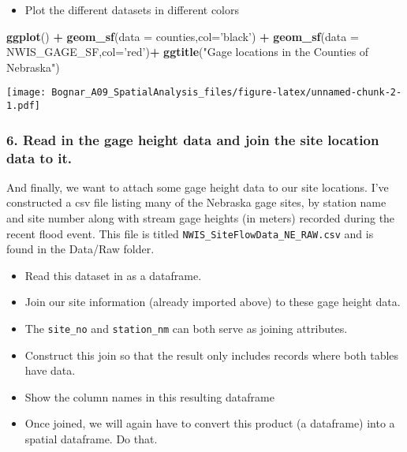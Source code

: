 \documentclass[]{article}
\newenvironment{Shaded}{\begin{snugshade}}{\end{snugshade}}
\newcommand{\KeywordTok}[1]{\textcolor[rgb]{0.13,0.29,0.53}{\textbf{#1}}}
\newcommand{\DataTypeTok}[1]{\textcolor[rgb]{0.13,0.29,0.53}{#1}}
\newcommand{\StringTok}[1]{\textcolor[rgb]{0.31,0.60,0.02}{#1}}
\newcommand{\OperatorTok}[1]{\textcolor[rgb]{0.81,0.36,0.00}{\textbf{#1}}}
\newcommand{\NormalTok}[1]{#1}
\providecommand{\tightlist}{%
  \setlength{\itemsep}{0pt}\setlength{\parskip}{0pt}}
\begin{document}
\begin{itemize}
\tightlist
\item
  Plot the different datasets in different colors
\end{itemize}

\begin{Shaded}
\begin{Highlighting}[]
\KeywordTok{ggplot}\NormalTok{() }\OperatorTok{+}\StringTok{ }
\StringTok{  }\KeywordTok{geom_sf}\NormalTok{(}\DataTypeTok{data =}\NormalTok{ counties,}\DataTypeTok{col=}\StringTok{'black'}\NormalTok{) }\OperatorTok{+}\StringTok{ }
\StringTok{  }\KeywordTok{geom_sf}\NormalTok{(}\DataTypeTok{data =}\NormalTok{ NWIS_GAGE_SF,}\DataTypeTok{col=}\StringTok{'red'}\NormalTok{)}\OperatorTok{+}
\StringTok{  }\KeywordTok{ggtitle}\NormalTok{(}\StringTok{"Gage locations in the Counties of Nebraska"}\NormalTok{)}
\end{Highlighting}
\end{Shaded}

\texttt{[image: Bognar\_A09\_SpatialAnalysis\_files/figure-latex/unnamed-chunk-2-1.pdf]}

\subsubsection{6. Read in the gage height data and join the site
location data to
it.}\label{read-in-the-gage-height-data-and-join-the-site-location-data-to-it.}

And finally, we want to attach some gage height data to our site
locations. I've constructed a csv file listing many of the Nebraska gage
sites, by station name and site number along with stream gage heights
(in meters) recorded during the recent flood event. This file is titled
\texttt{NWIS\_SiteFlowData\_NE\_RAW.csv} and is found in the Data/Raw
folder.

\begin{itemize}
\tightlist
\item
  Read this dataset in as a dataframe.
\item
  Join our site information (already imported above) to these gage
  height data.
\item
  The \texttt{site\_no} and \texttt{station\_nm} can both serve as
  joining attributes.
\item
  Construct this join so that the result only includes records where
  both tables have data.
\item
  Show the column names in this resulting dataframe
\item
  Once joined, we will again have to convert this product (a dataframe)
  into a spatial dataframe. Do that.
\end{itemize}
\end{document}
